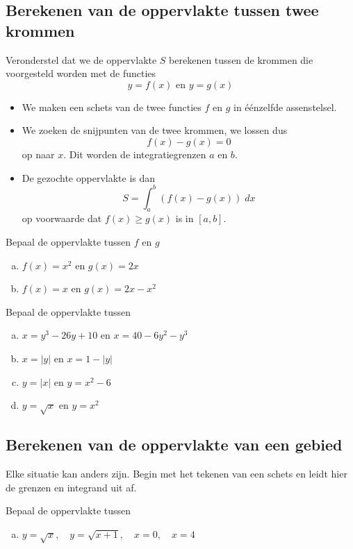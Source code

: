 \documentclass[a4paper,12pt, twoside]{article}
\begin{document}
\subsection{Berekenen van de oppervlakte tussen twee krommen}

Veronderstel dat we de oppervlakte $S$ berekenen tussen de krommen die voorgesteld worden met de functies
$$y=f(x) \text{ en } y=g(x)$$
\begin{itemize}
\item We maken een schets van de twee functies $f$ en $g$ in éénzelfde assenstelsel.
\item We zoeken de snijpunten van de twee krommen, we lossen dus
  $$f(x)-g(x)=0$$
  op naar $x$. Dit worden de integratiegrenzen $a$ en $b$.
\item De gezochte oppervlakte is dan
  $$S = \int_a^b (f(x)-g(x))\; dx$$
  op voorwaarde dat $f(x) \geq g(x)$ is in $[a,b]$.
\end{itemize}


\begin{oefening}
Bepaal de oppervlakte tussen $f$ en $g$
\begin{enumerate}[(a)]
\itemsep1em
  \item $f(x)=x^2$ en $g(x)=2x$
  \item $f(x)=x$ en $g(x)=2x-x^2$
\end{enumerate}
\end{oefening}

\begin{oefening}
Bepaal de oppervlakte tussen
\begin{enumerate}[(a)]
\itemsep1em
  \item $x=y^3-26y+10$ en $x=40-6y^2-y^3$
  \item $x=|y|$ en $x=1-|y|$
  \item $y=|x|$ en $y=x^2-6$
  \item $y=\sqrt{x}$ en $y=x^2$
\end{enumerate}
\end{oefening}

\subsection{Berekenen van de oppervlakte van een gebied}

Elke situatie kan anders zijn. Begin met het tekenen van een schets en leidt hier de grenzen en integrand uit af.

\begin{oefening}
Bepaal de oppervlakte tussen
\begin{enumerate}[(a)]
\itemsep1em
  \item $\displaystyle y=\sqrt{x},\quad y=\sqrt{x+1},\quad x=0, \quad x=4$
\end{enumerate}
\end{oefening}
\end{document}

